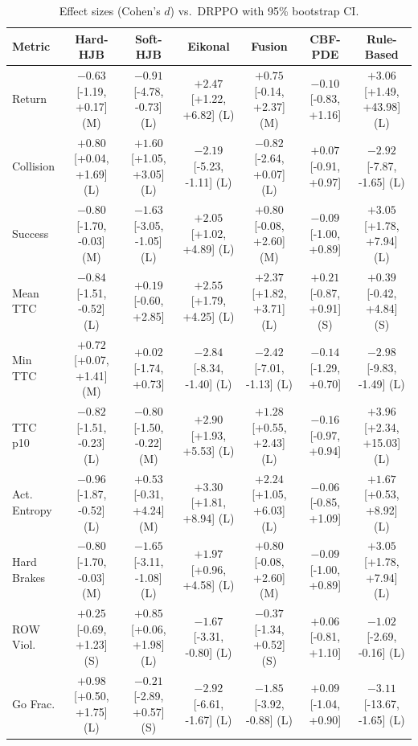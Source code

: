 \begin{table}[ht]
\centering
\caption{Effect sizes (Cohen's $d$) vs.\ DRPPO with 95\% bootstrap CI.}
\label{tab:effect_sizes}
\begin{tabular}{lcccccc}
\toprule
Metric & Hard-HJB & Soft-HJB & Eikonal & Fusion & CBF-PDE & Rule-Based \\
\midrule
Return & $-0.63$ [-1.19, +0.17] (M) & $-0.91$ [-4.78, -0.73] (L) & $+2.47$ [+1.22, +6.82] (L) & $+0.75$ [-0.14, +2.37] (M) & $-0.10$ [-0.83, +1.16] & $+3.06$ [+1.49, +43.98] (L) \\
Collision & $+0.80$ [+0.04, +1.69] (L) & $+1.60$ [+1.05, +3.05] (L) & $-2.19$ [-5.23, -1.11] (L) & $-0.82$ [-2.64, +0.07] (L) & $+0.07$ [-0.91, +0.97] & $-2.92$ [-7.87, -1.65] (L) \\
Success & $-0.80$ [-1.70, -0.03] (M) & $-1.63$ [-3.05, -1.05] (L) & $+2.05$ [+1.02, +4.89] (L) & $+0.80$ [-0.08, +2.60] (M) & $-0.09$ [-1.00, +0.89] & $+3.05$ [+1.78, +7.94] (L) \\
Mean TTC & $-0.84$ [-1.51, -0.52] (L) & $+0.19$ [-0.60, +2.85] & $+2.55$ [+1.79, +4.25] (L) & $+2.37$ [+1.82, +3.71] (L) & $+0.21$ [-0.87, +0.91] (S) & $+0.39$ [-0.42, +4.84] (S) \\
Min TTC & $+0.72$ [+0.07, +1.41] (M) & $+0.02$ [-1.74, +0.73] & $-2.84$ [-8.34, -1.40] (L) & $-2.42$ [-7.01, -1.13] (L) & $-0.14$ [-1.29, +0.70] & $-2.98$ [-9.83, -1.49] (L) \\
TTC p10 & $-0.82$ [-1.51, -0.23] (L) & $-0.80$ [-1.50, -0.22] (M) & $+2.90$ [+1.93, +5.53] (L) & $+1.28$ [+0.55, +2.43] (L) & $-0.16$ [-0.97, +0.94] & $+3.96$ [+2.34, +15.03] (L) \\
Act. Entropy & $-0.96$ [-1.87, -0.52] (L) & $+0.53$ [-0.31, +4.24] (M) & $+3.30$ [+1.81, +8.94] (L) & $+2.24$ [+1.05, +6.03] (L) & $-0.06$ [-0.85, +1.09] & $+1.67$ [+0.53, +8.92] (L) \\
Hard Brakes & $-0.80$ [-1.70, -0.03] (M) & $-1.65$ [-3.11, -1.08] (L) & $+1.97$ [+0.96, +4.58] (L) & $+0.80$ [-0.08, +2.60] (M) & $-0.09$ [-1.00, +0.89] & $+3.05$ [+1.78, +7.94] (L) \\
ROW Viol. & $+0.25$ [-0.69, +1.23] (S) & $+0.85$ [+0.06, +1.98] (L) & $-1.67$ [-3.31, -0.80] (L) & $-0.37$ [-1.34, +0.52] (S) & $+0.06$ [-0.81, +1.10] & $-1.02$ [-2.69, -0.16] (L) \\
Go Frac. & $+0.98$ [+0.50, +1.75] (L) & $-0.21$ [-2.89, +0.57] (S) & $-2.92$ [-6.61, -1.67] (L) & $-1.85$ [-3.92, -0.88] (L) & $+0.09$ [-1.04, +0.90] & $-3.11$ [-13.67, -1.65] (L) \\

\end{tabular}
\end{table}
